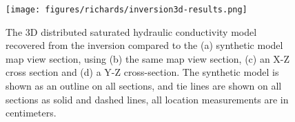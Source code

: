 \begin{figure}[!htbp]
\begin{center}
\texttt{[image: figures/richards/inversion3d-results.png]}
\end{center}
\caption{The 3D distributed saturated hydraulic conductivity model recovered from the inversion compared to the (a) synthetic model map view section, using (b) the same map view section, (c) an X-Z cross section and (d) a Y-Z cross-section. The synthetic model is shown as an outline on all sections, and tie lines are shown on all sections as solid and dashed lines, all location measurements are in centimeters.}
\label{fig:richards-inversion3d-results}
\end{figure}

